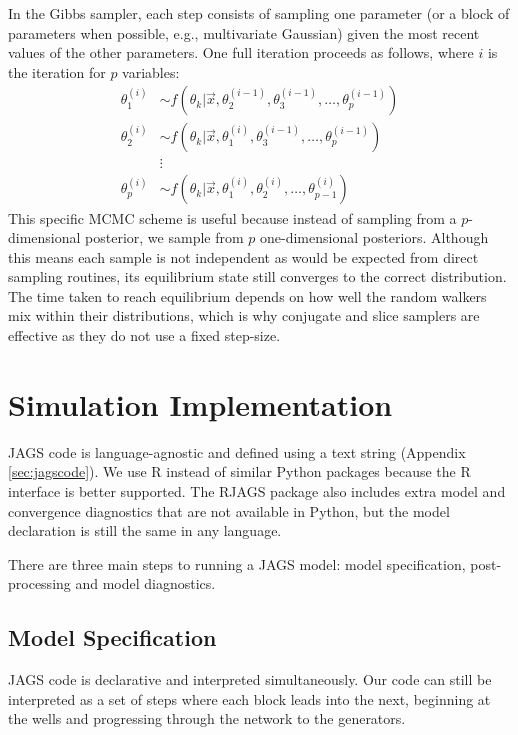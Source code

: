 \documentclass[a4paper, 12pt]{article}
\begin{document}
In the Gibbs sampler, each step consists of sampling one parameter (or a block of parameters when possible, e.g., multivariate Gaussian) given the most recent values of the other parameters. One full iteration proceeds as follows, where $i$ is the iteration for $p$ variables:
\begin{align}
\theta_1^{(i)} &\sim f\left( \theta_k|\vec{x}, \theta_2^{(i-1)}, \theta_3^{(i-1)},\dots, \theta_p^{(i-1)} \right)\\
\theta_2^{(i)} &\sim f\left( \theta_k|\vec{x}, \theta_1^{(i)}, \theta_3^{(i-1)},\dots, \theta_p^{(i-1)} \right)\\
&\vdots\nonumber\\
\theta_p^{(i)} &\sim f\left( \theta_k|\vec{x}, \theta_1^{(i)}, \theta_2^{(i)},\dots, \theta_{p-1}^{(i)} \right)
\end{align}
This specific MCMC scheme is useful because instead of sampling from a $p$-dimensional posterior, we sample from $p$ one-dimensional posteriors. Although this means each sample is not independent as would be expected from direct sampling routines, its equilibrium state still converges to the correct distribution. The time taken to reach equilibrium depends on how well the random walkers mix within their distributions, which is why conjugate and slice samplers are effective as they do not use a fixed step-size.


\section{Simulation Implementation}
JAGS code is language-agnostic and defined using a text string (Appendix \ref{sec:jagscode}). We use R instead of similar Python packages because the R interface is better supported. The RJAGS package also includes extra model and convergence diagnostics that are not available in Python, but the model declaration is still the same in any language.

There are three main steps to running a JAGS model: model specification, post-processing and model diagnostics.

\subsection{Model Specification}
JAGS code is declarative and interpreted simultaneously. Our code can still be interpreted as a set of steps where each block leads into the next, beginning at the wells and progressing through the network to the generators.
\end{document}
